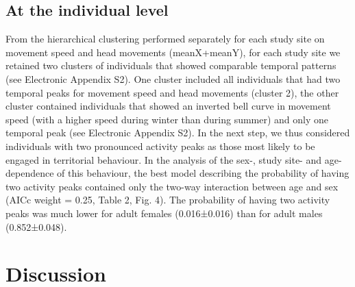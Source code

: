 \documentclass[a4paper,11pt]{article}
\begin{document}
\subsection{At the individual level}
From the hierarchical clustering performed separately for each study site on movement speed and head movements (meanX+meanY), for each study site we retained two clusters of individuals that showed comparable temporal patterns (see Electronic Appendix S2). One cluster included all individuals that had two temporal peaks for movement speed and head movements (cluster 2), the other cluster contained individuals that showed an inverted bell curve in movement speed (with a higher speed during winter than during summer) and only one temporal peak (see Electronic Appendix S2). In the next step, we thus considered individuals with two pronounced activity peaks as those most likely to be engaged in territorial behaviour. In the analysis of the sex-, study site- and age- dependence of this behaviour, the best model describing the probability of having two activity peaks contained only the two-way interaction between age and sex (AICc weight = 0.25, Table 2, Fig. 4). The probability of having two activity peaks was much lower for adult females (0.016±0.016) than for adult males (0.852±0.048).

\section{Discussion}



\end{document}
